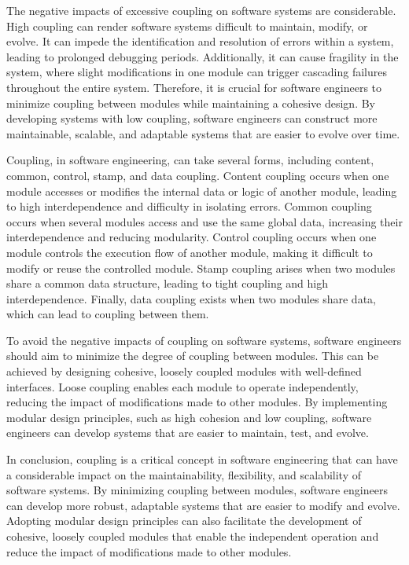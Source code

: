 The negative impacts of excessive coupling on software systems are considerable. High
coupling can render software systems difficult to maintain, modify, or evolve. It can
impede the identification and resolution of errors within a system, leading to prolonged
debugging periods. Additionally, it can cause fragility in the system, where slight
modifications in one module can trigger cascading failures throughout the entire system.
Therefore, it is crucial for software engineers to minimize coupling between modules while
maintaining a cohesive design. By developing systems with low coupling, software engineers
can construct more maintainable, scalable, and adaptable systems that are easier to evolve
over time.

Coupling, in software engineering, can take several forms, including content, common,
control, stamp, and data coupling. Content coupling occurs when one module accesses or
modifies the internal data or logic of another module, leading to high interdependence and
difficulty in isolating errors. Common coupling occurs when several modules access and use
the same global data, increasing their interdependence and reducing modularity. Control
coupling occurs when one module controls the execution flow of another module, making it
difficult to modify or reuse the controlled module. Stamp coupling arises when two modules
share a common data structure, leading to tight coupling and high interdependence.
Finally, data coupling exists when two modules share data, which can lead to coupling
between them.

To avoid the negative impacts of coupling on software systems, software engineers should
aim to minimize the degree of coupling between modules. This can be achieved by designing
cohesive, loosely coupled modules with well-defined interfaces. Loose coupling enables
each module to operate independently, reducing the impact of modifications made to other
modules. By implementing modular design principles, such as high cohesion and low
coupling, software engineers can develop systems that are easier to maintain, test, and
evolve.

In conclusion, coupling is a critical concept in software engineering that can have a
considerable impact on the maintainability, flexibility, and scalability of software
systems. By minimizing coupling between modules, software engineers can develop more
robust, adaptable systems that are easier to modify and evolve. Adopting modular design
principles can also facilitate the development of cohesive, loosely coupled modules that
enable the independent operation and reduce the impact of modifications made to other
modules.